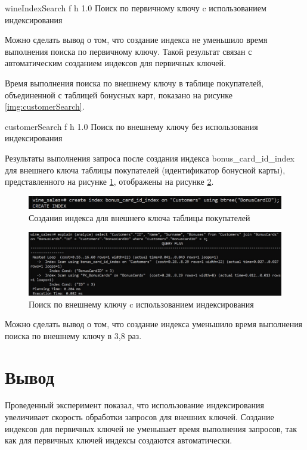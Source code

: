     {wineIndexSearch}
    {f}
    {h}
    {1.0\textwidth}
    {Поиск по первичному ключу c использованием индексирования}

Можно сделать вывод о том, что создание индекса не уменьшило время выполнения поиска по первичному ключу. Такой результат связан с автоматическим созданием индексов для первичных ключей.
   
Время выполнения поиска по внешнему ключу в таблице покупателей, объединенной с таблицей бонусных карт, показано на рисунке \ref{img:customerSearch}.

    {customerSearch}
    {f}
    {h}
    {1.0\textwidth}
    {Поиск по внешнему ключу без использования индексирования}
    
Результаты выполнения запроса после создания индекса bonus\_card\_id\_index для внешнего ключа таблицы покупателей (идентификатор бонусной карты), представленного на рисунке \ref{img:createCustomerIndex}, отображены на рисунке \ref{img:customerIndexSearch}.

\begin{figure}[H]
	\begin{center}
		\includegraphics[scale=0.4]{inc/img/createCustomerIndex.jpg}
	\end{center}
	\captionsetup{justification=centering}
	\caption{Создания индекса для внешнего ключа таблицы покупателей}
	\label{img:createCustomerIndex}
\end{figure}

\begin{figure}[H]
	\begin{center}
		\includegraphics[scale=0.3]{inc/img/customerIndexSearch.jpg}
	\end{center}
	\captionsetup{justification=centering}
	\caption{Поиск по внешнему ключу c использованием индексирования}
	\label{img:customerIndexSearch}
\end{figure}

Можно сделать вывод о том, что создание индекса уменьшило время выполнения поиска по внешнему ключу в 3,8 раз. 

\section*{Вывод}

Проведенный эксперимент показал, что использование индексирования увеличивает скорость обработки запросов для внешних ключей. Создание индексов для первичных ключей не уменьшает время выполнения запросов, так как для первичных ключей индексы создаются автоматически.